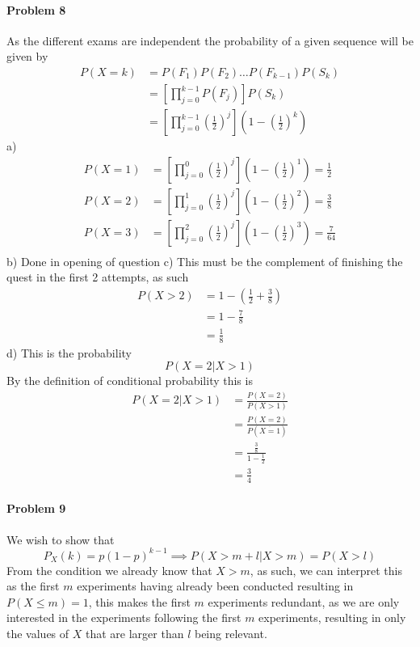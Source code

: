 \paragraph{Problem 8}
As the different exams are independent the probability of a given sequence will be given by
\begin{align*}
    P(X=k)&=P(F_{1})P(F_{2})\ldots P(F_{k-1})P(S_{k}) \\
          &=\left[\prod_{j=0}^{k-1}P(F_{j})\right]P(S_{k}) \\
          &=\left[\prod_{j=0}^{k-1}\left(\frac{1}{2}\right)^{j}\right]\left(1-\left(\frac{1}{2}\right)^{k}\right)
\end{align*}
a)
\begin{align*}
    P(X=1)&=\left[\prod_{j=0}^{0}\left(\frac{1}{2}\right)^{j}\right]\left(1-\left(\frac{1}{2}\right)^{1}\right)=\frac{1}{2} \\
    P(X=2)&=\left[\prod_{j=0}^{1}\left(\frac{1}{2}\right)^{j}\right]\left(1-\left(\frac{1}{2}\right)^{2}\right)=\frac{3}{8} \\
    P(X=3)&=\left[\prod_{j=0}^{2}\left(\frac{1}{2}\right)^{j}\right]\left(1-\left(\frac{1}{2}\right)^{3}\right)=\frac{7}{64} \\
\end{align*}
b)
Done in opening of question
c)
This must be the complement of finishing the quest in the first 2 attempts, as such
\begin{align*}
    P(X>2)&=1-\left(\frac{1}{2}+\frac{3}{8}\right) \\
          &=1-\frac{7}{8} \\
          &=\frac{1}{8}
\end{align*}
d)
This is the probability
\[
    P(X=2|X>1)
\]
By the definition of conditional probability this is
\begin{align*}
    P(X=2|X>1)&=\frac{P(X=2)}{P(X>1)} \\
              &=\frac{P(X=2)}{P(\overline{X=1})} \\
              &=\frac{\frac{3}{8}}{1-\frac{1}{2}} \\
              &=\frac{3}{4}
\end{align*}
\paragraph{Problem 9}
We wish to show that
\[
    P_{X}(k)=p(1-p)^{k-1}\implies P(X>m+l|X>m)=P(X>l)
\]
From the condition we already know that $X>m$, as such, we can interpret this as the first $m$ experiments having already been conducted resulting in $P(X\leq m)=1$, this makes the first $m$ experiments redundant, as we are only interested in the experiments following the first $m$ experiments, resulting in only the values of $X$ that are larger than $l$ being relevant.
